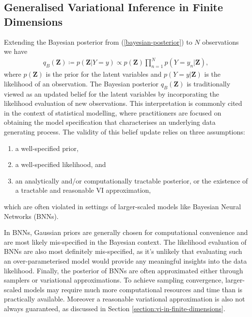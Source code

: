 \documentclass{article}
\numberwithin{equation}{section}
\begin{document}
\subsection{Generalised Variational Inference in Finite Dimensions}
Extending the Bayesian posterior from (\ref{bayesian-posterior}) to $N$ observations we have
\begin{align}
    \label{bayesian-posterior-gvi}
    q_B(\mathbf{Z}) \coloneqq p(\mathbf{Z}\vert Y=y) \propto p(\mathbf{Z}) \prod_{n=1}^N p(Y=y_n \vert \mathbf{Z}),
\end{align}
where $p(\mathbf{Z})$ is the prior for the latent variables and $p(Y=y \vert \mathbf{Z})$ is the likelihood of an observation.
The Bayesian posterior $q_B(\mathbf{Z})$ is traditionally viewed as an updated belief for the latent variables by incorporating the likelihood evaluation of new observations.
This interpretation is commonly cited in the context of statistical modelling, where practitioners are focused on obtaining the model specification that characterises an underlying data generating process. 
The validity of this belief update relies on three assumptions:
\begin{enumerate}
    \setlength\itemsep{-0.25em}
    \item a well-specified prior,
    \item a well-specified likelihood, and
    \item an analytically and/or computationally tractable posterior, or the existence of a tractable and reasonable VI approximation,
\end{enumerate}
which are often violated in settings of larger-scaled models like Bayesian Neural Networks (BNNs).

In BNNs, Gaussian priors are generally chosen for computational convenience and are most likely mis-specified in the Bayesian context.
The likelihood evaluation of BNNs are also most definitely mis-specified, as it's unlikely that evaluating such an over-parameterised model would provide any meaningful insights into the data likelihood.
Finally, the posterior of BNNs are often approximated either through samplers or variational approximations.
To achieve sampling convergence, larger-scaled models may require much more computational resources and time than is practically available.
Moreover a reasonable variational approximation is also not always guaranteed, as discussed in Section \ref{section:vi-in-finite-dimensions}.
\end{document}
